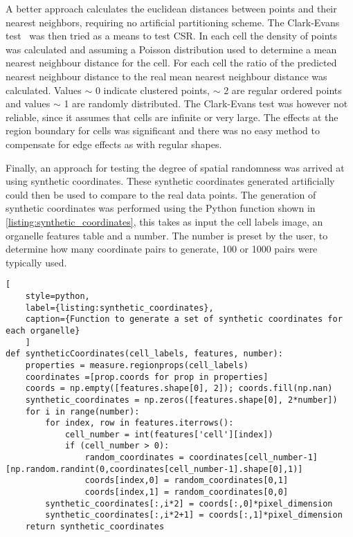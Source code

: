 A better approach calculates the euclidean distances between points and their nearest neighbors, requiring no artificial partitioning scheme. The Clark-Evans test~\cite{Clark1954} was then tried as a means to test CSR. In each cell the density of points was calculated and assuming a Poisson distribution used to determine a mean nearest neighbour distance for the cell. For each cell the ratio of the predicted nearest neighbour distance to the real mean nearest neighbour distance was calculated. Values $\sim$ 0 indicate clustered points, $\sim$ 2 are regular ordered points and values $\sim$ 1 are randomly distributed. The Clark-Evans test was however not reliable, since it assumes that cells are infinite or very large. The effects at the region boundary for cells was significant and there was no easy method to compensate for edge effects as with regular shapes.

Finally, an approach for testing the degree of spatial randomness was arrived at using synthetic coordinates. These synthetic coordinates generated artificially could then be used to compare to the real data points. The generation of synthetic coordinates was performed using the Python function shown in \autoref{listing:synthetic_coordinates}, this takes as input the cell labels image, an organelle features table and a number. The number is preset by the user, to determine how many coordinate pairs to generate, 100 or 1000 pairs were typically used.

\begin{lstlisting}[
	style=python,
	label={listing:synthetic_coordinates},
	caption={Function to generate a set of synthetic coordinates for each organelle}
	]
def syntheticCoordinates(cell_labels, features, number):
    properties = measure.regionprops(cell_labels)
    coordinates =[prop.coords for prop in properties] 
    coords = np.empty([features.shape[0], 2]); coords.fill(np.nan)
    synthetic_coordinates = np.zeros([features.shape[0], 2*number])
    for i in range(number):
        for index, row in features.iterrows():
            cell_number = int(features['cell'][index])
            if (cell_number > 0):
                random_coordinates = coordinates[cell_number-1][np.random.randint(0,coordinates[cell_number-1].shape[0],1)]
                coords[index,0] = random_coordinates[0,1]
                coords[index,1] = random_coordinates[0,0]
        synthetic_coordinates[:,i*2] = coords[:,0]*pixel_dimension
        synthetic_coordinates[:,i*2+1] = coords[:,1]*pixel_dimension
    return synthetic_coordinates
\end{lstlisting}

